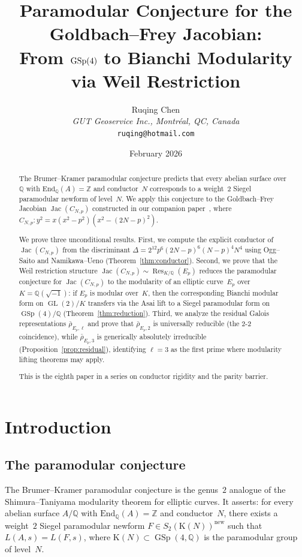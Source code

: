 \documentclass[11pt,a4paper]{article}
\title{Paramodular Conjecture for the Goldbach--Frey Jacobian:\\From $\GSp(4)$ to Bianchi Modularity via Weil Restriction}
\author{Ruqing Chen\\[4pt]
\textit{GUT Geoservice Inc., Montr\'{e}al, QC, Canada}\\[2pt]
\texttt{ruqing@hotmail.com}}
\date{February 2026}
\theoremstyle{definition}
\DeclareMathOperator{\GL}{GL}
\DeclareMathOperator{\GSp}{GSp}
\DeclareMathOperator{\Jac}{Jac}
\DeclareMathOperator{\Res}{Res}
\begin{document}
\maketitle

\begin{abstract}
The Brumer--Kramer paramodular conjecture predicts that every abelian surface over~$\mathbb{Q}$ with $\mathrm{End}_\mathbb{Q}(A) = \mathbb{Z}$ and conductor~$N$ corresponds to a weight~$2$ Siegel paramodular newform of level~$N$. We apply this conjecture to the Goldbach--Frey Jacobian $\Jac(C_{N,p})$ constructed in our companion paper~\cite{Companion7}, where $C_{N,p} : y^2 = x(x^2 - p^2)(x^2 - (2N-p)^2)$.

We prove three unconditional results. First, we compute the explicit conductor of $\Jac(C_{N,p})$ from the discriminant $\Delta = 2^{12} p^6(2N-p)^6(N-p)^4 N^4$ using Ogg--Saito and Namikawa--Ueno (Theorem~\ref{thm:conductor}). Second, we prove that the Weil restriction structure $\Jac(C_{N,p}) \sim \Res_{K/\mathbb{Q}}(E_p)$ reduces the paramodular conjecture for $\Jac(C_{N,p})$ to the modularity of an elliptic curve~$E_p$ over $K = \mathbb{Q}(\sqrt{-1})$: if $E_p$ is modular over~$K$, then the corresponding Bianchi modular form on $\GL(2)/K$ transfers via the Asai lift to a Siegel paramodular form on $\GSp(4)/\mathbb{Q}$ (Theorem~\ref{thm:reduction}). Third, we analyze the residual Galois representations $\bar{\rho}_{E_p,\ell}$ and prove that $\bar{\rho}_{E_p,2}$ is universally reducible (the 2-2 coincidence), while $\bar{\rho}_{E_p,3}$ is generically absolutely irreducible (Proposition~\ref{prop:residual}), identifying $\ell = 3$ as the first prime where modularity lifting theorems may apply.

This is the eighth paper in a series on conductor rigidity and the parity barrier.
\end{abstract}

\section{Introduction}

\subsection{The paramodular conjecture}

The Brumer--Kramer paramodular conjecture \cite{BK} is the genus~$2$ analogue of the Shimura--Taniyama modularity theorem for elliptic curves. It asserts: for every abelian surface $A/\mathbb{Q}$ with $\mathrm{End}_\mathbb{Q}(A) = \mathbb{Z}$ and conductor~$N$, there exists a weight~$2$ Siegel paramodular newform $F \in S_2(\mathrm{K}(N))^{\mathrm{new}}$ such that $L(A, s) = L(F, s)$, where $\mathrm{K}(N) \subset \GSp(4, \mathbb{Q})$ is the paramodular group of level~$N$.
\end{document}

